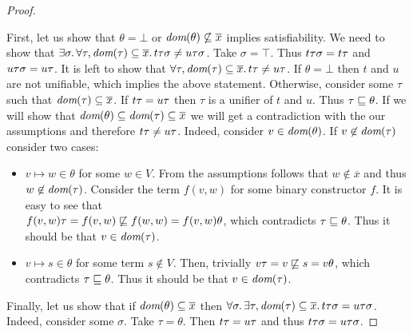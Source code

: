 \begin{proof}
  \label{lemma:univ-diseq-sat}

  First, let us show that 
  $\theta = \bot$ or $\textit{dom}{({\theta})} \not\subseteq \overline{x}$ 
  implies satisfiability.
  We need to show that 
  $\exists \sigma\ldotp 
            \forall \tau, \textit{dom}{({\tau})} \subseteq \overline{x}\ldotp 
            {{t}{\tau}}{\sigma} \neq {{u}{\tau}}{\sigma}$.
  Take $\sigma = \top$. 
  Thus ${{t}{\tau}}{\sigma} = {t}{\tau}$ and 
  ${{u}{\tau}}{\sigma} = {u}{\tau}$.
  It is left to show that 
  $\forall \tau, \textit{dom}{({\tau})} \subseteq \overline{x}\ldotp 
  {t}{\tau} \neq {u}{\tau}$.
  If $\theta = \bot$ then $t$ and $u$ are not unifiable,
  which implies the above statement.
  Otherwise, consider some $\tau$ such that 
  $\textit{dom}{({\tau})} \subseteq \overline{x}$.
  If ${t}{\tau} = {u}{\tau}$ then $\tau$ is a unifier 
  of $t$ and $u$. Thus $\tau \sqsubseteq \theta$.
  If we will show that $\textit{dom}{({\theta})} \subseteq \textit{dom}{({\tau})} \subseteq \overline{x}$
  we will get a contradiction with the our assumptions and
  therefore ${t}{\tau} \neq {u}{\tau}$.
  Indeed, consider $v \in \textit{dom}{({\theta})}$. 
  If $v \not\in \textit{dom}{({\tau})}$ consider two cases:
  \begin{itemize}
    \item $v \mapsto w \in \theta$ for some $w \in V$.
      From the assumptions follows that $w \not\in \overline{x}$
      and thus $w \not\in \textit{dom}{({\tau})}$.
      Consider the term $f(v, w)$ for some binary constructor $f$.
      It is easy to see that \\
      ${{f(v, w)}{\tau} = f(v, w) \not\sqsubseteq f(w, w) = {f(v, w)}{\theta}}$,
      which contradicts $\tau \sqsubseteq \theta$. 
      Thus it should be that ${v \in \textit{dom}{({\tau})}}$.
    \item $v \mapsto s \in \theta$ for some term $s \not\in V$.
      Then, trivially 
      ${v}{\tau} = v \not\sqsubseteq s = {v}{\theta}$,
      which contradicts $\tau \sqsubseteq \theta$. 
      Thus it should be that $v \in \textit{dom}{({\tau})}$.
  \end{itemize}

  Finally, let us show that if $\textit{dom}{({\theta})} \subseteq \overline{x}$ 
  then ${\forall \sigma\ldotp 
            \exists \tau, \textit{dom}{({\tau})} \subseteq \overline{x}\ldotp 
            {{t}{\tau}}{\sigma} = {{u}{\tau}}{\sigma}
        }$.
  Indeed, consider some $\sigma$.
  Take $\tau = \theta$. 
  Then ${t}{\tau} = {u}{\tau}$ and thus
  ${{t}{\tau}}{\sigma} = {{u}{\tau}}{\sigma}$.
\end{proof}

